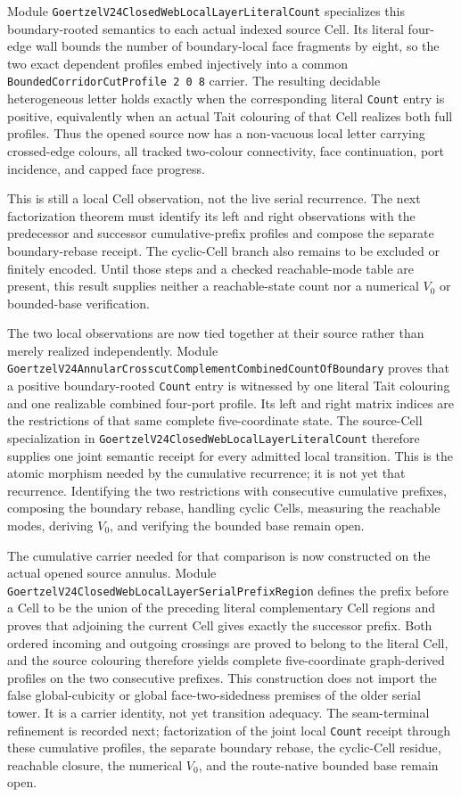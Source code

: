 \documentclass[11pt]{article}
\theoremstyle{definition}
\begin{document}
Module \texttt{GoertzelV24ClosedWebLocalLayerLiteralCount} specializes this
boundary-rooted semantics to each actual indexed source Cell.  Its literal
four-edge wall bounds the number of boundary-local face fragments by eight,
so the two exact dependent profiles embed injectively into a common
\texttt{BoundedCorridorCutProfile 2 0 8} carrier.  The resulting decidable
heterogeneous letter holds exactly when the corresponding literal
\texttt{Count} entry is positive, equivalently when an actual Tait colouring
of that Cell realizes both full profiles.  Thus the opened source now has a
non-vacuous local letter carrying crossed-edge colours, all tracked two-colour
connectivity, face continuation, port incidence, and capped face progress.

This is still a local Cell observation, not the live serial recurrence.  The
next factorization theorem must identify its left and right observations with
the predecessor and successor cumulative-prefix profiles and compose the
separate boundary-rebase receipt.  The cyclic-Cell branch also remains to be
excluded or finitely encoded.  Until those steps and a checked reachable-mode
table are present, this result supplies neither a reachable-state count nor a
numerical $V_0$ or bounded-base verification.

The two local observations are now tied together at their source rather than
merely realized independently.  Module
\texttt{GoertzelV24AnnularCrosscutComplementCombinedCountOfBoundary} proves
that a positive boundary-rooted \texttt{Count} entry is witnessed by one
literal Tait colouring and one realizable combined four-port profile.  Its
left and right matrix indices are the restrictions of that same complete
five-coordinate state.  The source-Cell specialization in
\texttt{GoertzelV24ClosedWebLocalLayerLiteralCount} therefore supplies one
joint semantic receipt for every admitted local transition.  This is the
atomic morphism needed by the cumulative recurrence; it is not yet that
recurrence.  Identifying the two restrictions with consecutive cumulative
prefixes, composing the boundary rebase, handling cyclic Cells, measuring the
reachable modes, deriving $V_0$, and verifying the bounded base remain open.

The cumulative carrier needed for that comparison is now constructed on the
actual opened source annulus.  Module
\texttt{GoertzelV24ClosedWebLocalLayerSerialPrefixRegion} defines the prefix
before a Cell to be the union of the preceding literal complementary Cell
regions and proves that adjoining the current Cell gives exactly the successor
prefix.  Both ordered incoming and outgoing crossings are proved to belong to
the literal Cell, and the source colouring therefore yields complete
five-coordinate graph-derived profiles on the two consecutive prefixes.  This
construction does not import the false global-cubicity or global
face-two-sidedness premises of the older serial tower.  It is a carrier
identity, not yet transition adequacy.  The seam-terminal refinement is
recorded next; factorization of the joint local \texttt{Count} receipt through
these cumulative profiles, the separate boundary rebase, the cyclic-Cell
residue, reachable closure, the numerical $V_0$, and the route-native bounded
base remain open.
\end{document}
